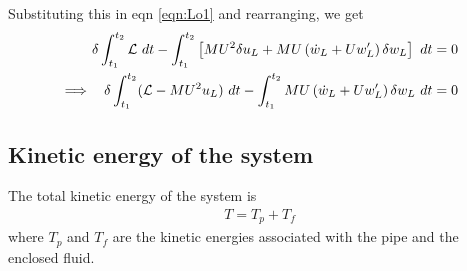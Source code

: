 \documentclass[12pt]{report}
\begin{document}
Substituting this in eqn \ref{eqn:Lo1} and rearranging, we get
\begin{align}
\delta \int_{t_1}^{t_2}\mathcal{L}~dt - \int_{t_1}^{t_2}\left[ MU^2\delta u_L + MU\left(\dot{w}_L + Uw_L'\right)\delta w_L\right]~dt &= 0 \notag \\
\implies~~\delta \int_{t_1}^{t_2} (\mathcal{L} - MU^2 u_L)~dt - \int_{t_1}^{t_2}MU\left(\dot{w}_L + Uw_L'\right)\delta w_L~dt &= 0 \label{eqn:Lo2}
\end{align}

\subsection{Kinetic energy of the system} 
The total kinetic energy of the system is 
\begin{align}
T = T_p + T_f
\end{align}
where $T_p$ and $T_f$ are the kinetic energies associated with the pipe and the enclosed fluid.
\end{document}
